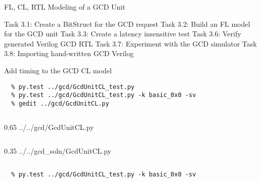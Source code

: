 
\begin{frame}{ FL, CL, RTL Modeling of a GCD Unit}
\begin{cbxlist}
  \1 Task 3.1: Create a BitStruct for the GCD request
  \1 Task 3.2: Build an FL model for the GCD unit
  \1 Task 3.3: Create a latency insensitive test
  \1 
  \1 
  \1 Task 3.6: Verify generated Verilog GCD RTL
  \1 Task 3.7: Experiment with the GCD simulator
  \1 Task 3.8: Importing hand-written GCD Verilog
\end{cbxlist}
\end{frame}

\begin{task}\begin{frame}[fragile]{Add timing to the GCD CL model}

\vspace{-0.15in}
\begin{Verbatim}[commandchars=\\\{\}]
  % cd \midtilde/pymtl-tut/build
  % py.test ../gcd/GcdUnitCL_test.py
  % py.test ../gcd/GcdUnitCL_test.py -k basic_0x0 -sv
  % gedit ../gcd/GcdUnitCL.py
\end{Verbatim}
\vspace{-0.1in}

  \begin{cbxcols}
  \begin{column}{0.65\tw}
%
{../../gcd/GcdUnitCL.py}
  \end{column}
  \begin{column}{0.35\tw}
%
{../../gcd_soln/GcdUnitCL.py}
  \end{column}
  \end{cbxcols}

\vspace{-.2in}
\begin{verbatim}
  % py.test ../gcd/GcdUnitCL_test.py -k basic_0x0 -sv
\end{verbatim}
\end{frame}
\end{task}

